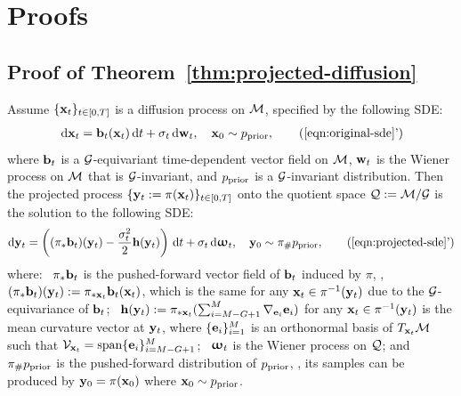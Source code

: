 \section{Proofs}\label{appx:proofs}


\subsection{Proof of Theorem~\ref{thm:projected-diffusion}}\label{appx:proof-thm1}
\begin{theorem*}\label{thm:projected-diffusion-appx}
    Assume $\{\mathbf{x}_t\}_{t\in[0,T]}$ is a diffusion process on $\mathcal{M}$, specified by the following SDE: 
  \begin{align}
    \ud \bfxx_t = \bfbb_t(\bfxx_t) \ud t + \sigma_t \ud \bfww_t, \quad \bfxx_0 \sim p_\prior,
    \tag{\ref{eqn:original-sde}'}
  \end{align}
  where $\mathbf{b}_t$ is a $\mathcal{G}$-equivariant time-dependent vector field on $\mathcal{M}$, $\mathbf{w}_t$ is the Wiener process on $\mathcal{M}$ that is $\mathcal{G}$-invariant, and $p_{\mathrm{prior}}$ is a $\mathcal{G}$-invariant distribution.
  Then the projected process $\{\mathbf{y}_t:=\pi(\mathbf{x}_t)\}_{t\in[0,T]}$ onto the quotient space $\mathcal{Q} := \mathcal{M}/\mathcal{G}$ is the solution to the following SDE:
  \begin{align}
    \dd\bfyy_t = \left( (\pi_*\bfbb_t)(\bfyy_t) - \frac{\sigma_t^2}{2} \bfhh(\bfyy_t) \right) \ud t + \sigma_t \ud \bfomega_t, \quad \bfyy_0 \sim \pi_{\#}p_\prior,
    \tag{\ref{eqn:projected-sde}'}
  \end{align}
  where:
  \itemone~$\pi_*\mathbf{b}_t$ is the pushed-forward vector field of $\mathbf{b}_t$ induced by $\pi$, \ie, $(\pi_* \mathbf{b}_t)(\mathbf{y}_t) := \pi_{*\mathbf{x}_t} \mathbf{b}_t(\mathbf{x}_t)$, which is the same for any $\mathbf{x}_t \in \pi^{-1}(\mathbf{y}_t)$ due to the $\mathcal{G}$-equivariance of $\mathbf{b}_t$;
  \itemtwo~$\mathbf{h}(\mathbf{y}_t) := \pi_{*\mathbf{x}_t}(\sum_{i=M-G+1}^M \nabla_{\mathbf{e}_i} \mathbf{e}_i)$ for any $\mathbf{x}_t \in \pi^{-1}(\mathbf{y}_t)$ is the mean curvature vector at $\mathbf{y}_t$, where $\{\mathbf{e}_i\}_{i=1}^M$ is an orthonormal basis of $T_{\mathbf{x}_t} \mathcal{M}$ such that $\mathcal{V}_{\mathbf{x}_t} = \mathrm{span}\{\mathbf{e}_i\}_{i=M-G+1}^M$;
  \itemthr~${\bm{\upomega}}_t$ is the Wiener process on $\mathcal{Q}$; and
  \itemfor~$\pi_{\#}p_{\mathrm{prior}}$ is the pushed-forward distribution of $p_{\mathrm{prior}}$, \ie, its samples can be produced by $\mathbf{y}_0 = \pi(\mathbf{x}_0)$ where $\mathbf{x}_0 \sim p_{\mathrm{prior}}$.
\end{theorem*}
